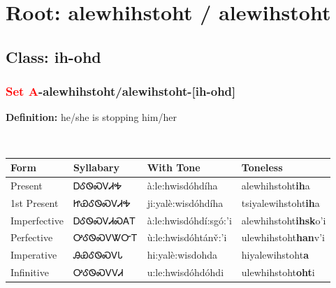 \needspace{4in}
\section*{Root: alewhihstoht / alewihstoht}
\nopagebreak
{}
\needspace{3in}
\subsection*{Class: ih-ohd}
\nopagebreak
\needspace{2in}
\subsubsection*{\textcolor{Red}{Set A}{-}\textbf{alewhihstoht/alewihstoht}{-}[ih-ohd]}
\nopagebreak
\textbf{Definition: } he/she is stopping him/her
\\[0.5em]
\begin{tabularx}{\textwidth}{l X X X}%
\toprule%
\textbf{Form}&\textbf{Syllabary}&\textbf{With Tone}&\textbf{Toneless}\\%
\midrule%
Present&ᎠᎴᏫᏍᏙᏗᎭ&à:le:hwisdóhdíha&alewhihstoht\textbf{ih}a\\%
1st Present&ᏥᏯᎴᏫᏍᏙᏗᎭ&ji:yalè:wisdóhdíha&tsiyalewihstoht\textbf{ih}a\\%
Imperfective&ᎠᎴᏫᏍᏙᏗᏍᎪᎢ&à:le:hwisdóhdí:sgó:’i&alewhihstoht\textbf{ihsk}o'i\\%
Perfective&ᎤᎴᏫᏍᏙᏔᏅᎢ&ù:le:hwisdóhtánv̌:’i&ulewhihstoht\textbf{han}v'i\\%
Imperative&ᎯᏯᎴᏫᏍᏙᏓ&hi:yalè:wisdohda&hiyalewihstoht\textbf{a}\\%
Infinitive&ᎤᎴᏫᏍᏙᏙᏗ&u:le:hwisdóhdóhdi&ulewhihstoht\textbf{oht}i\\%
\bottomrule%
\end{tabularx}
\\[1em]